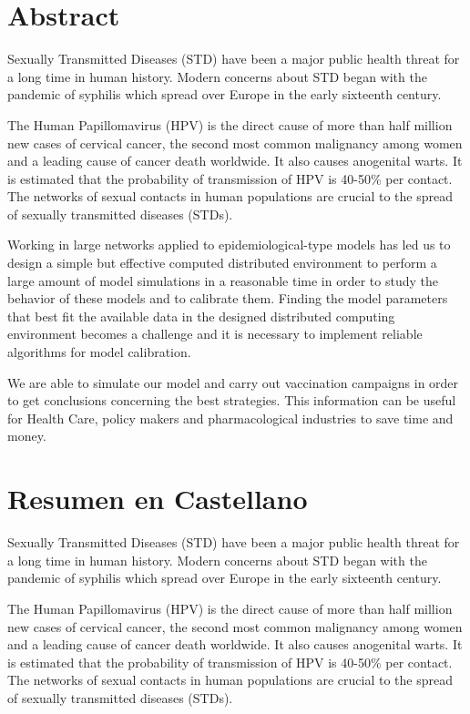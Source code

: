 
\chapter*{Abstract}
Sexually Transmitted Diseases (STD) have been a major public health threat for a long time in human history. Modern concerns about STD began with the pandemic of syphilis which spread over Europe in the early sixteenth century. 

The Human Papillomavirus (HPV) is the direct cause of more than half million new cases of cervical cancer, the second most common malignancy among women and a leading cause of cancer death worldwide. It also causes anogenital warts. It is estimated that the probability of transmission of HPV is 40-50\% per contact. The networks of sexual contacts in human populations are crucial to the spread of sexually transmitted diseases (STDs).

Working in large networks applied to epidemiological-type models has led us to design a simple but effective computed distributed environment to perform a large amount of model simulations in a reasonable time in order to study the behavior of these models and to calibrate them. Finding the model parameters that best fit the available data in the designed distributed computing environment becomes a challenge and it is necessary to implement reliable algorithms for model calibration.

We are able to simulate our model and carry out vaccination campaigns in order to get conclusions concerning the best strategies. This information can be useful for Health Care, policy makers and pharmacological industries to save time and money.

\chapter*{Resumen en Castellano}
Sexually Transmitted Diseases (STD) have been a major public health threat for a long time in human history. Modern concerns about STD began with the pandemic of syphilis which spread over Europe in the early sixteenth century. 

The Human Papillomavirus (HPV) is the direct cause of more than half million new cases of cervical cancer, the second most common malignancy among women and a leading cause of cancer death worldwide. It also causes anogenital warts. It is estimated that the probability of transmission of HPV is 40-50\% per contact. The networks of sexual contacts in human populations are crucial to the spread of sexually transmitted diseases (STDs).

